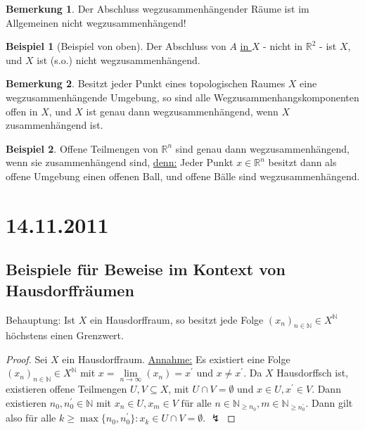 \documentclass[a4paper,11pt,notitlepage]{report}
\theoremstyle{definition}
\newtheorem{remark}{Bemerkung}[chapter]
\newtheorem{example}{Beispiel}[chapter]
\newcommand{\R}{{\ensuremath{\mathbb{R}}}}
\newcommand{\N}{{\ensuremath{\mathbb{N}}}}
\begin{document}
\begin{remark}
	Der Abschluss wegzusammenhängender Räume ist im Allgemeinen nicht wegzusammenhängend!
\end{remark}

\begin{example}[Beispiel von oben]
	Der Abschluss von $A$ \underline{in $X$} - nicht in $\R^2$ - ist $X$, und $X$ ist (s.o.) nicht wegzusammenhängend.
\end{example}

\begin{remark}
	Besitzt jeder Punkt eines topologischen Raumes $X$ eine wegzusammenhängende Umgebung, so sind alle Wegzusammenhangskomponenten offen in $X$, und $X$ ist genau dann wegzusammenhängend, wenn $X$ zusammenhängend ist.
\end{remark}

\begin{example}
	Offene Teilmengen von $\R^n$ sind genau dann wegzusammenhängend, wenn sie zusammenhängend sind, \underline{denn:}
	\newline
	Jeder Punkt $x \in \R^n$ besitzt dann als offene Umgebung einen offenen Ball, und offene Bälle sind wegzusammenhängend.
\end{example}

\chapter{14.11.2011}
\section{Beispiele für Beweise im Kontext von Hausdorffräumen}
\begin{theorem}{Behauptung:}
Ist $X$ ein Hausdorffraum, so besitzt jede Folge $(x_n)_{n \in \N} \in X^\N$ höchstens einen Grenzwert.
\end{theorem}
\begin{proof}
	Sei $X$ ein Hausdorffraum.
	\newline
	\underline{Annahme:} Es existiert eine Folge $(x_n)_{n \in \N} \in X^\N$ mit $x = \lim\limits_{n \rightarrow \infty}(x_n) = x^\prime$ und $x \neq x^\prime$.
	\newline
	Da $X$ Hausdorffsch ist, existieren offene Teilmengen $U,V \subseteq X$, mit $U \cap V = \emptyset$ und $x \in U, x^\prime \in V$. Dann existieren $n_0, n_0^\prime \in \N$ mit $x_n \in U, x_m \in V \text{ für alle } n \in \N_{\geq n_0}, m \in \N_{\geq n_0^\prime}$. Dann gilt also für alle $k \geq \max\{n_0,n_0^\prime\} \colon x_k \in U \cap V=\emptyset$. $\lightning$
\end{proof}
\end{document}
